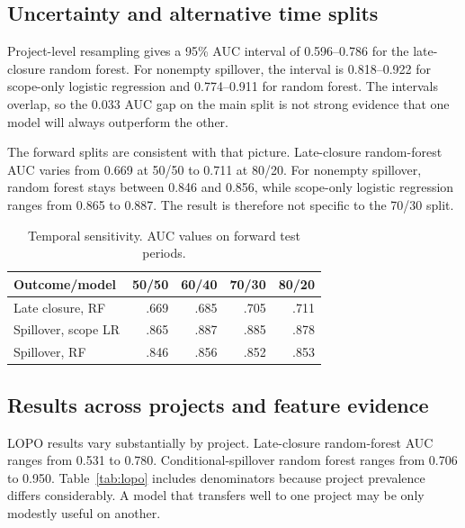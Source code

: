 \documentclass[conference]{IEEEtran}
\begin{document}
\subsection{Uncertainty and alternative time splits}
Project-level resampling gives a 95\% AUC interval of 0.596--0.786 for the late-closure random forest. For nonempty spillover, the interval is 0.818--0.922 for scope-only logistic regression and 0.774--0.911 for random forest. The intervals overlap, so the 0.033 AUC gap on the main split is not strong evidence that one model will always outperform the other.

The forward splits are consistent with that picture. Late-closure random-forest AUC varies from 0.669 at 50/50 to 0.711 at 80/20. For nonempty spillover, random forest stays between 0.846 and 0.856, while scope-only logistic regression ranges from 0.865 to 0.887. The result is therefore not specific to the 70/30 split.

\begin{table}[!htb]
\centering\scriptsize
\caption{Temporal sensitivity. AUC values on forward test periods.}
\label{tab:temporal}
\setlength{\tabcolsep}{3pt}
\begin{tabular}{@{}lrrrr@{}}
\toprule
Outcome/model & 50/50 & 60/40 & 70/30 & 80/20\\
\midrule
Late closure, RF & .669 & .685 & .705 & .711\\
Spillover, scope LR & .865 & .887 & .885 & .878\\
Spillover, RF & .846 & .856 & .852 & .853\\
\bottomrule
\end{tabular}
\end{table}

\subsection{Results across projects and feature evidence}
LOPO results vary substantially by project. Late-closure random-forest AUC ranges from 0.531 to 0.780. Conditional-spillover random forest ranges from 0.706 to 0.950. Table~\ref{tab:lopo} includes denominators because project prevalence differs considerably. A model that transfers well to one project may be only modestly useful on another.
\end{document}
